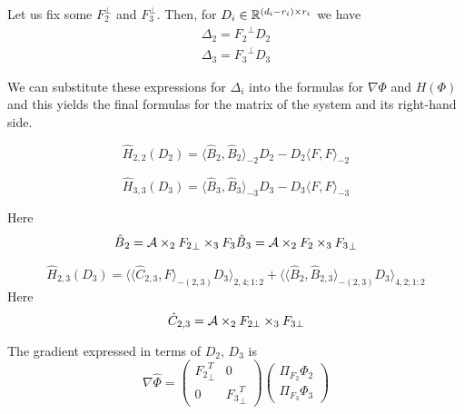 Let us fix some
$F_{2}^{\bot}$ and $F_3^{\bot}$. Then, for $D_i \in \mathbb{R}^{(d_i - r_i) \times r_i}$
we have
\begin{eqnarray}
\Delta{_2} = {F_2}^{\bot} D{_2} \\
\Delta{_3} = {F_3}^{\bot} D{_3}
\end{eqnarray}

We can substitute these expressions
for $\Delta_i$ into the formulas for $\nabla \Phi$ and $H(\Phi)$
and this yields the final formulas for the matrix of the system
and its right-hand side.



\begin{equation}
\hat{{H}}_{2,2}(D{_2}) = \langle \hat{B}{_2}, \hat{B}{_2} \rangle_{-2} D{_2} - D{_2} \langle F, F \rangle _{-2}
\end{equation}

\begin{equation}
\hat{{H}}_{3,3}(D{_3}) = \langle \hat{B}{_3}, \hat{B}{_3} \rangle_{-3} D{_3} - D{_3} \langle F, F \rangle _{-3}
\end{equation}

Here
\begin{eqnarray}
\hat{B}{_2} = \mathcal{A} \times_2 {F_2}_{\bot} \times_3 {F_3}
\hat{B}{_3} = \mathcal{A} \times_2 {F_2} \times_3 {F_3}_{\bot}
\end{eqnarray}


\begin{equation}
\hat{{H}}_{2,3}(D{_3}) = \langle \langle \hat{C}_{2,3}, F \rangle_{-(2,3)} D{_3} \rangle_{2,4;1:2} + \langle \langle \hat{B}_{2}, \hat{B}_{2,3} \rangle_{-(2,3)} D{_3} \rangle_{4,2;1:2}
\end{equation}
Here
\begin{equation}
    \hat{C}_{2,3} = \mathcal{A} \times_2 F_{2 \bot} \times_3 F_{3 \bot}
\end{equation}

The gradient expressed in terms of $D_2$, $D_3$ is
\begin{equation}
\nabla \hat{\Phi} = \begin{pmatrix}
{F_2}_{\bot}^T & 0 \\
0 & {F_3}^T_{\bot} 
\end{pmatrix} \begin{pmatrix}
\Pi_{{F_2}}\Phi{_2} \\
\Pi_{F_3} \Phi{_3}
\end{pmatrix}
\end{equation}

